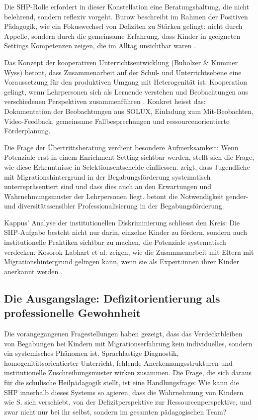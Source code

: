 \documentclass[ngerman, a4paper]{article}
\begin{document}
Die SHP-Rolle erfordert in dieser Konstellation eine Beratungshaltung, die nicht
belehrend, sondern reflexiv vorgeht. Burow beschreibt im Rahmen der Positiven
Pädagogik, wie ein Fokuswechsel von Defiziten zu Stärken gelingt: nicht durch
Appelle, sondern durch die gemeinsame Erfahrung, dass Kinder in geeigneten Settings
Kompetenzen zeigen, die im Alltag unsichtbar waren
\parencite{burow2020future,burow2021positive}.
 
Das Konzept der kooperativen Unterrichtsentwicklung (Buholzer \& Kummer Wyss)
betont, dass Zusammenarbeit auf der Schul- und Unterrichtsebene eine Voraussetzung
für den produktiven Umgang mit Heterogenität ist. Kooperation gelingt, wenn
Lehrpersonen sich als Lernende verstehen und Beobachtungen aus verschiedenen
Perspektiven zusammenführen \parencite{buholzer2010allegleich}. Konkret heisst das:
Dokumentation der Beobachtungen aus SOLUX, Einladung zum Mit-Beobachten,
Video-Feedback, gemeinsame Fallbesprechungen und ressourcenorientierte Förderplanung.
 
Die Frage der Übertrittsberatung verdient besondere Aufmerksamkeit: Wenn Potenziale
erst in einem Enrichment-Setting sichtbar werden, stellt sich die Frage, wie diese
Erkenntnisse in Selektionsentscheide einfliessen. \textcite{leikhof2021jugendliche} zeigt, dass Jugendliche mit
Migrationshintergrund in der Begabungsförderung systematisch unterrepräsentiert sind
und dass dies auch an den Erwartungen und Wahrnehmungsmuster der Lehrpersonen
liegt. \textcite{macha2019gender} betont die Notwendigkeit gender- und
diversitätssensibler Professionalisierung in der Begabungsförderung.
 
Kappus' Analyse der institutionellen Diskriminierung schliesst den Kreis: Die
SHP-Aufgabe besteht nicht nur darin, einzelne Kinder zu fördern, sondern auch
institutionelle Praktiken sichtbar zu machen, die Potenziale systematisch verdecken.
Kosorok Labhart et al. zeigen, wie die Zusammenarbeit mit Eltern mit
Migrationshintergrund gelingen kann, wenn sie als Expert:innen ihrer Kinder
anerkannt werden \parencite{kosoroklabhart2021voneltern}.

\subsection{Die Ausgangslage: Defizitorientierung als professionelle Gewohnheit}

Die vorangegangenen Fragestellungen haben gezeigt, dass das Verdecktbleiben von
Begabungen bei Kindern mit Migrationserfahrung kein individuelles, sondern ein
systemisches Phänomen ist. Sprachlastige Diagnostik, homogenitätsorientierter
Unterricht, fehlende Anerkennungsstrukturen und institutionelle Zuschreibungsmuster
wirken zusammen. Die Frage, die sich daraus für die schulische Heilpädagogik stellt,
ist eine Handlungsfrage: Wie kann die SHP innerhalb dieses Systems so agieren, dass
die Wahrnehmung von Kindern wie S. sich verschiebt, von der Defizitperspektive zur
Ressourcenperspektive, und zwar nicht nur bei ihr selbst, sondern im gesamten
pädagogischen Team?
\end{document}
